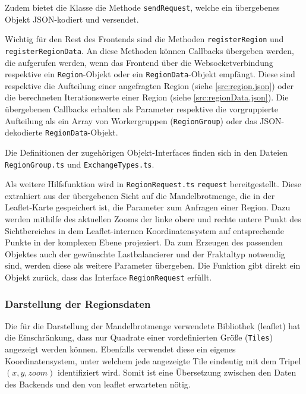 Zudem bietet die Klasse die Methode \texttt{sendRequest}, welche ein übergebenes Objekt JSON-kodiert und versendet.

Wichtig für den Rest des Frontends sind die Methoden \texttt{registerRegion} und \texttt{registerRegionData}.
An diese Methoden können Callbacks übergeben werden, die aufgerufen werden, wenn das Frontend über die Websocketverbindung
respektive ein \texttt{Region}-Objekt oder ein \texttt{RegionData}-Objekt empfängt.
Diese sind respektive die Aufteilung einer angefragten Region (siehe \autoref{src:region.json})
oder die berechneten Iterationswerte einer Region (siehe \autoref{src:regionData.json}).
Die übergebenen Callbacks erhalten als Parameter respektive die vorgruppierte Aufteilung als ein Array von Workergruppen (\texttt{RegionGroup})
oder das JSON-dekodierte \verb|RegionData|-Objekt.

Die Definitionen der zugehörigen Objekt-Interfaces finden sich in den Dateien \verb|RegionGroup.ts| und \verb|ExchangeTypes.ts|.

Als weitere Hilfsfunktion wird in \verb|RegionRequest.ts| \verb|request| bereitgestellt.
Diese extrahiert aus der übergebenen Sicht auf die Mandelbrotmenge, die in der Leaflet-Karte gespeichert ist,
die Parameter zum Anfragen einer Region.
Dazu werden mithilfe des aktuellen Zooms der linke obere und rechte untere Punkt des Sichtbereiches
in dem Leaflet-internen Koordinatensystem auf entsprechende Punkte in der komplexen Ebene projeziert.
Da zum Erzeugen des passenden Objektes auch der gewünschte Lastbalancierer und der Fraktaltyp notwendig sind,
werden diese als weitere Parameter übergeben.
Die Funktion gibt direkt ein Objekt zurück, dass das Interface \verb|RegionRequest| erfüllt.

\subsubsection{Darstellung der Regionsdaten} %

Die für die Darstellung der Mandelbrotmenge verwendete Bibliothek (leaflet) hat die Einschränkung, dass
nur Quadrate einer vordefinierten Größe (\verb|Tiles|) angezeigt werden können. Ebenfalls verwendet diese ein
eigenes Koordinatensystem, unter welchem jede angezeigte Tile eindeutig mit dem Tripel \( (x, y, zoom) \)
identifiziert wird. Somit ist eine Übersetzung zwischen den Daten des Backends und den von leaflet erwarteten nötig.

